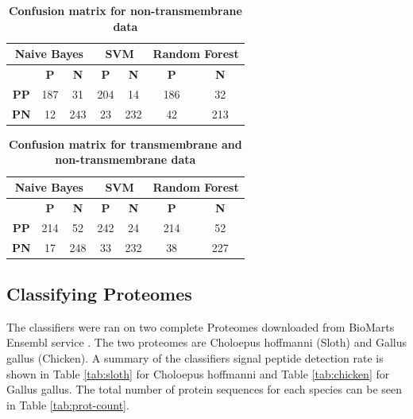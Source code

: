 \documentclass[10pt,letterpaper]{article}
\begin{document}
	\begin{table}[!ht]
		\centering
		\caption{{\bf Confusion matrix for non-transmembrane data}}
		\label{tab:conf-non-tm}
		\begin{tabular}{ccccccc}
			\multicolumn{3}{c}{Naive Bayes}                            & \multicolumn{2}{c}{SVM}                      & \multicolumn{2}{c}{Random Forest} \\ \hline
			& \textbf{P} & \multicolumn{1}{c|}{\textbf{N}} & \textbf{P} & \multicolumn{1}{c|}{\textbf{N}} & \textbf{P}      & \textbf{N}      \\ \hline
			\textbf{PP} & 187        & \multicolumn{1}{c|}{31}         & 204        & \multicolumn{1}{c|}{14}         & 186             & 32              \\
			\textbf{PN} & 12         & \multicolumn{1}{c|}{243}        & 23         & \multicolumn{1}{c|}{232}        & 42              & 213             \\ \hline
		\end{tabular}
	\end{table}

\begin{table}[]
	\centering
	\caption{{\bf Confusion matrix for transmembrane and non-transmembrane data }}
	\label{tab:conf-all}
	\begin{tabular}{ccccccc}
		\multicolumn{3}{c}{Naive Bayes}                            & \multicolumn{2}{c}{SVM}                      & \multicolumn{2}{c}{Random Forest} \\ \hline
		& \textbf{P} & \multicolumn{1}{c|}{\textbf{N}} & \textbf{P} & \multicolumn{1}{c|}{\textbf{N}} & \textbf{P}      & \textbf{N}      \\ \hline
		\textbf{PP} & 214        & \multicolumn{1}{c|}{52}         & 242        & \multicolumn{1}{c|}{24}         & 214             & 52              \\
		\textbf{PN} & 17         & \multicolumn{1}{c|}{248}        & 33         & \multicolumn{1}{c|}{232}        & 38              & 227             \\ \hline
	\end{tabular}
\end{table}
	
	\subsection*{Classifying Proteomes}
	The classifiers were ran on two complete Proteomes downloaded from BioMarts Ensembl service \cite{ensembl}. The two proteomes are Choloepus hoffmanni (Sloth) and Gallus gallus (Chicken). A summary of the classifiers signal peptide detection rate is shown in Table \ref{tab:sloth} for Choloepus hoffmanni and Table \ref{tab:chicken} for Gallus gallus. The total number of protein sequences for each species can be seen in Table \ref{tab:prot-count}.
	
\end{document}
